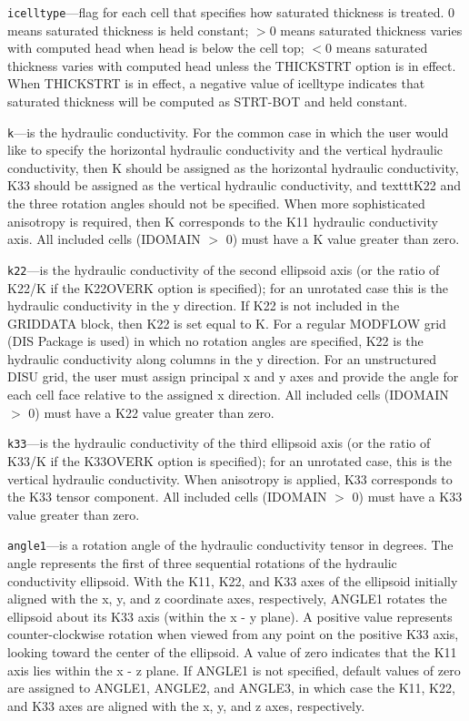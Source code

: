 \begin{description}
\item \texttt{icelltype}---flag for each cell that specifies how saturated thickness is treated.  0 means saturated thickness is held constant;  $>$0 means saturated thickness varies with computed head when head is below the cell top; $<$0 means saturated thickness varies with computed head unless the THICKSTRT option is in effect.  When THICKSTRT is in effect, a negative value of icelltype indicates that saturated thickness will be computed as STRT-BOT and held constant.

\item \texttt{k}---is the hydraulic conductivity.  For the common case in which the user would like to specify the horizontal hydraulic conductivity and the vertical hydraulic conductivity, then K should be assigned as the horizontal hydraulic conductivity, K33 should be assigned as the vertical hydraulic conductivity, and texttt{K22} and the three rotation angles should not be specified.  When more sophisticated anisotropy is required, then K corresponds to the K11 hydraulic conductivity axis.  All included cells (IDOMAIN $>$ 0) must have a K value greater than zero.

\item \texttt{k22}---is the hydraulic conductivity of the second ellipsoid axis (or the ratio of K22/K if the K22OVERK option is specified); for an unrotated case this is the hydraulic conductivity in the y direction.  If K22 is not included in the GRIDDATA block, then K22 is set equal to K.  For a regular MODFLOW grid (DIS Package is used) in which no rotation angles are specified, K22 is the hydraulic conductivity along columns in the y direction. For an unstructured DISU grid, the user must assign principal x and y axes and provide the angle for each cell face relative to the assigned x direction.  All included cells (IDOMAIN $>$ 0) must have a K22 value greater than zero.

\item \texttt{k33}---is the hydraulic conductivity of the third ellipsoid axis (or the ratio of K33/K if the K33OVERK option is specified); for an unrotated case, this is the vertical hydraulic conductivity.  When anisotropy is applied, K33 corresponds to the K33 tensor component.  All included cells (IDOMAIN $>$ 0) must have a K33 value greater than zero.

\item \texttt{angle1}---is a rotation angle of the hydraulic conductivity tensor in degrees. The angle represents the first of three sequential rotations of the hydraulic conductivity ellipsoid. With the K11, K22, and K33 axes of the ellipsoid initially aligned with the x, y, and z coordinate axes, respectively, ANGLE1 rotates the ellipsoid about its K33 axis (within the x - y plane). A positive value represents counter-clockwise rotation when viewed from any point on the positive K33 axis, looking toward the center of the ellipsoid. A value of zero indicates that the K11 axis lies within the x - z plane. If ANGLE1 is not specified, default values of zero are assigned to ANGLE1, ANGLE2, and ANGLE3, in which case the K11, K22, and K33 axes are aligned with the x, y, and z axes, respectively.


\end{description}
